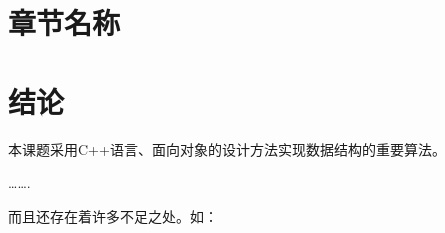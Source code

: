 \documentclass[../../main.tex]{subfiles}
\begin{document}
\section{章节名称}

\section{结论}
本课题采用C++语言、面向对象的设计方法实现数据结构的重要算法。

…….

而且还存在着许多不足之处。如：
\end{document}
